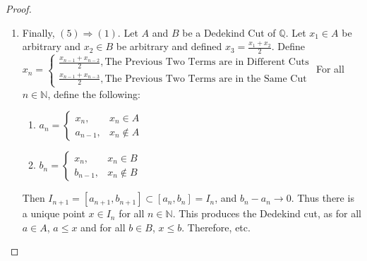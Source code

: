 \begin{proof}
\begin{enumerate}
            \item Finally, $(5)\Rightarrow (1)$. Let $A$ and $B$ be a Dedekind Cut of $\mathbb{Q}$. Let $x_1 \in A$ be arbitrary and $x_2 \in B$ be arbitrary and defined $x_3 = \frac{x_1+x_2}{2}$. Define\\ $x_n = \begin{cases} \frac{x_{n-1}+x_{n-2}}{2}, \textrm{The Previous Two Terms are in Different Cuts}\\\frac{x_{n-1}+x_{n-3}}{2}, \textrm{The Previous Two Terms are in the Same Cut}\end{cases}$
            For all $n\in \mathbb{N}$, define the following:
            \begin{enumerate}
            \item $a_n = \begin{cases} x_n, & x_n \in A \\ a_{n-1}, & x_n \notin A\end{cases}$
            \item $b_n = \begin{cases} x_n, & x_n \in B \\ b_{n-1}, & x_n \notin B\end{cases}$
            \end{enumerate}
            Then $I_{n+1} = [a_{n+1},b_{n+1}] \subset [a_n,b_n]=I_n$, and $b_n-a_n \rightarrow 0$. Thus there is a unique point $x\in I_n$ for all $n\in \mathbb{N}$. This produces the Dedekind cut, as for all $a\in A$, $a\leq x$ and for all $b\in B$, $x\leq b$. Therefore, etc.
            \end{enumerate}
            \end{proof}
